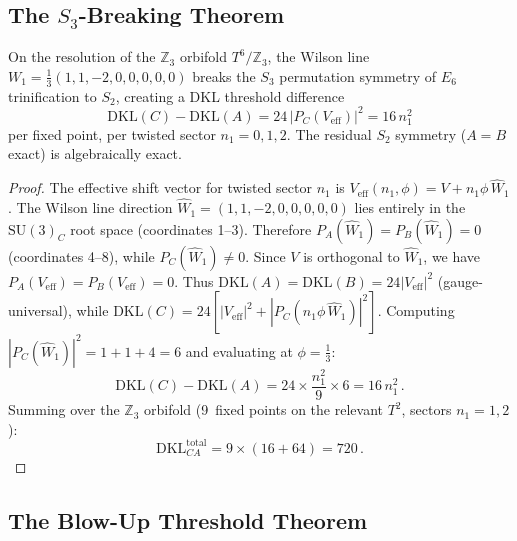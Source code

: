 \subsection{The $S_3$-Breaking Theorem}
\label{sec:4-s3-breaking-gap}

\begin{theorem}[$S_3$-Breaking]
\label{thm:4-s3-breaking-gap}
On the resolution of the $\mathbb{Z}_3$ orbifold $T^6/\mathbb{Z}_3$, the Wilson line $W_1 = \tfrac{1}{3}(1,1,-2,0,0,0,0,0)$ breaks the $S_3$ permutation symmetry of $E_6$ trinification to $S_2$, creating a DKL threshold difference
\begin{equation}
  \mathrm{DKL}(C) - \mathrm{DKL}(A) = 24\,|P_C(V_{\mathrm{eff}})|^2 = 16\,n_1^2
  \label{eq:4-s3-breaking-dkl}
\end{equation}
per fixed point, per twisted sector $n_1 = 0, 1, 2$.  The residual $S_2$ symmetry ($A = B$ exact) is algebraically exact.
\end{theorem}

\begin{proof}
The effective shift vector for twisted sector $n_1$ is $V_{\mathrm{eff}}(n_1, \phi) = V + n_1 \phi\, \hat{W}_1$.  The Wilson line direction $\hat{W}_1 = (1,1,-2,0,0,0,0,0)$ lies entirely in the $\mathrm{SU}(3)_C$ root space (coordinates 1--3).  Therefore $P_A(\hat{W}_1) = P_B(\hat{W}_1) = 0$ (coordinates 4--8), while $P_C(\hat{W}_1) \neq 0$.  Since $V$ is orthogonal to $\hat{W}_1$, we have $P_A(V_{\mathrm{eff}}) = P_B(V_{\mathrm{eff}}) = 0$.  Thus $\mathrm{DKL}(A) = \mathrm{DKL}(B) = 24|V_{\mathrm{eff}}|^2$ (gauge-universal), while $\mathrm{DKL}(C) = 24[|V_{\mathrm{eff}}|^2 + |P_C(n_1 \phi\, \hat{W}_1)|^2]$.  Computing $|P_C(\hat{W}_1)|^2 = 1 + 1 + 4 = 6$ and evaluating at $\phi = \tfrac{1}{3}$:
\begin{equation}
  \mathrm{DKL}(C) - \mathrm{DKL}(A) = 24 \times \frac{n_1^2}{9} \times 6 = 16\,n_1^2\,.
\end{equation}
Summing over the $\mathbb{Z}_3$ orbifold (9~fixed points on the relevant $T^2$, sectors $n_1 = 1, 2$):
\begin{equation}
  \mathrm{DKL}_{C\!A}^{\mathrm{total}} = 9 \times (16 + 64) = 720\,.
  \label{eq:4-dkl-total}
\end{equation}
\end{proof}


\subsection{The Blow-Up Threshold Theorem}
\label{sec:4-blowup-theorem}

